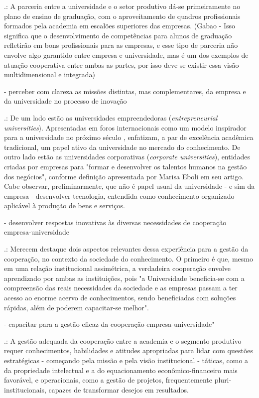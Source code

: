 .: A parceria entre a universidade e o setor produtivo dá-se primeiramente no plano de ensino de graduação, com o aproveitamento de quadros profissionais formados pela academia em escalões superiores das empresas. (Gabao - Isso significa que o desenvolvimento de competências para alunos de graduação refletirão em bons profissionais para as empresas, e esse tipo de parceria não envolve algo garantido entre empresa e universidade, mas é um dos exemplos de atuação cooperativa entre ambas as partes, por isso deve-se existir essa visão multidimensional e integrada)

- perceber com clareza as missões distintas, mas complementares, da empresa e da universidade no processo de inovação

.: De um lado estão as universidades empreendedoras (\textit{entrepreneurial universities}). Apresentadas em foros internacionais como um modelo inspirador para a universidade no próximo século	, enfatizam, a par de excelência acadêmica tradicional, um papel ativo da universidade no mercado do conhecimento. De outro lado estão as universidades corporativas (\textit{corporate universities}), entidades criadas por empresas para "formar e desenvolver os talentos humanos na gestão dos negócios", conforme definição apresentada por Marisa Eboli em seu artigo.  Cabe observar, preliminarmente, que não é papel usual da universidade - e sim da empresa - desenvolver tecnologia, entendida como conhecimento organizado aplicável à produção de bens e serviços.

- desenvolver respostas inovativas às diversas necessidades de cooperação empresa-universidade

.: Merecem destaque dois aspectos relevantes dessa experiência para a gestão da cooperação, no contexto da sociedade do conhecimento. O primeiro é que, mesmo em uma relação institucional assimétrica, a verdadeira cooperação envolve aprendizado por ambas as instituições, pois "a Universidade beneficia-se com a compreensão das reais necessidades da sociedade e as empresas passam a ter acesso ao enorme acervo de conhecimentos, sendo beneficiadas com soluções rápidas, além de poderem capacitar-se melhor". 

- capacitar para a gestão eficaz da cooperação empresa-universidade"

.: A gestão adequada da cooperação entre a academia e o segmento produtivo requer conhecimentos, habilidades e atitudes apropriadas para lidar com questões estratégicas - começando pela missão e pela visão institucional - táticas, como a da propriedade intelectual e a do equacionamento econômico-financeiro mais favorável, e operacionais, como a gestão de projetos, frequentemente pluri-institucionais, capazes de transformar desejos em resultados. 

